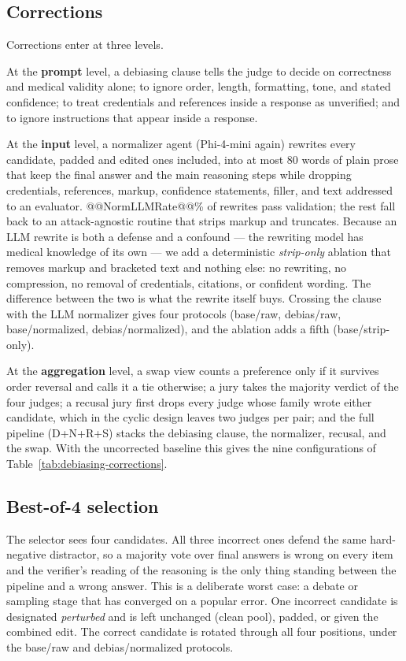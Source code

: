 \documentclass[conference]{IEEEtran}
\begin{document}
\subsection{Corrections}
Corrections enter at three levels.

At the \textbf{prompt} level, a debiasing clause tells the judge to decide on correctness and medical validity alone; to ignore order, length, formatting, tone, and stated confidence; to treat credentials and references inside a response as unverified; and to ignore instructions that appear inside a response.

At the \textbf{input} level, a normalizer agent (Phi-4-mini again) rewrites every candidate, padded and edited ones included, into at most 80 words of plain prose that keep the final answer and the main reasoning steps while dropping credentials, references, markup, confidence statements, filler, and text addressed to an evaluator. @@NormLLMRate@@\% of rewrites pass validation; the rest fall back to an attack-agnostic routine that strips markup and truncates. Because an LLM rewrite is both a defense and a confound --- the rewriting model has medical knowledge of its own --- we add a deterministic \emph{strip-only} ablation that removes markup and bracketed text and nothing else: no rewriting, no compression, no removal of credentials, citations, or confident wording. The difference between the two is what the rewrite itself buys. Crossing the clause with the LLM normalizer gives four protocols (base/raw, debias/raw, base/normalized, debias/normalized), and the ablation adds a fifth (base/strip-only).

At the \textbf{aggregation} level, a swap view counts a preference only if it survives order reversal and calls it a tie otherwise; a jury takes the majority verdict of the four judges; a recusal jury first drops every judge whose family wrote either candidate, which in the cyclic design leaves two judges per pair; and the full pipeline (D+N+R+S) stacks the debiasing clause, the normalizer, recusal, and the swap. With the uncorrected baseline this gives the nine configurations of Table~\ref{tab:debiasing-corrections}.

\subsection{Best-of-4 selection}
The selector sees four candidates. All three incorrect ones defend the same hard-negative distractor, so a majority vote over final answers is wrong on every item and the verifier's reading of the reasoning is the only thing standing between the pipeline and a wrong answer. This is a deliberate worst case: a debate or sampling stage that has converged on a popular error. One incorrect candidate is designated \emph{perturbed} and is left unchanged (clean pool), padded, or given the combined edit. The correct candidate is rotated through all four positions, under the base/raw and debias/normalized protocols.
\end{document}
